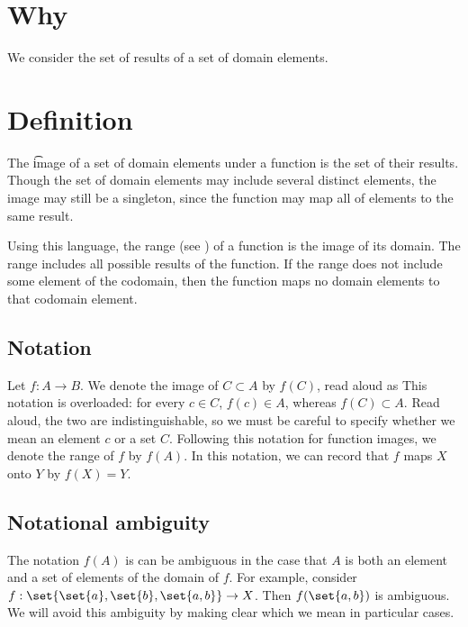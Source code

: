

\section*{Why}

We consider the set of results of a set of domain elements.

\section*{Definition}

The \t{image} of a set of domain elements under a function is the set of their results.
Though the set of domain elements may include several distinct elements, the image may still be a singleton, since the function may map all of elements to the same result.

Using this language, the range (see ) of a function is the image of its domain.
The range includes all possible results of the function.
If the range does not include some element of the codomain, then the function maps no domain elements to that codomain element.

\subsection*{Notation}

Let $f: A \to B$.
We denote the image of $C \subset A$ by $f(C)$, read aloud as 
This notation is overloaded: for every $c \in C$, $f(c) \in A$, whereas $f(C) \subset A$.
Read aloud, the two are indistinguishable, so we must be careful to specify whether we mean an element $c$ or a set $C$.
Following this notation for function images, we denote the range of $f$ by $f(A)$.
In this notation, we can record that $f$ maps $X$ onto $Y$ by $f(X) = Y$.

\subsection*{Notational ambiguity}

The notation $f(A)$ is can be ambiguous in the case that $A$ is both an element and a set of elements of the domain of $f$.
For example, consider $f: \set{\set{a}, \set{b}, \set{a, b}} \to X$.
Then $f(\set{a, b})$ is ambiguous.
We will avoid this ambiguity by making clear which we mean in particular cases.

